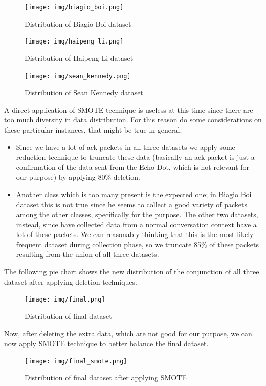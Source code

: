 \documentclass[sigconf]{acmart}
\begin{document}
\begin{figure}[h!]
        \texttt{[image: img/biagio\_boi.png]}
        \caption{Distribution of Biagio Boi dataset}
        \label{fig:parser}
    \end{figure}
    
\begin{figure}[h!]
        \texttt{[image: img/haipeng\_li.png]}
        \caption{Distribution of Haipeng Li dataset}
        \label{fig:parser}
    \end{figure}
    
\begin{figure}[h!]
        \texttt{[image: img/sean\_kennedy.png]}
        \caption{Distribution of Sean Kennedy dataset}
        \label{fig:parser}
    \end{figure}
A direct application of SMOTE technique is useless at this time since there are too much diversity in data distribution. For this reason do some considerations on these particular instances, that might be true in general:
\begin{itemize}
\item Since we have a lot of ack packets in all three datasets we apply some reduction technique to truncate these data (basically an ack packet is just a confirmation of the data sent from the Echo Dot, which is not relevant for our purpose) by applying 80\% deletion.
\item Another class which is too many present is the expected one; in Biagio Boi dataset this is not true since he seems to collect a good variety of packets among the other classes, specifically for the purpose. The other two datasets, instead, since have collected data from a normal conversation context have a lot of these packets. We can reasonably thinking that this is the most likely frequent dataset during collection phase, so we truncate 85\% of these packets resulting from the union of all three datasets.
\end{itemize}
The following pie chart shows the new distribution of the conjunction of all three dataset after applying deletion techniques.

\begin{figure}[h!]
        \texttt{[image: img/final.png]}
        \caption{Distribution of final dataset}
        \label{fig:parser}
    \end{figure}
    
Now, after deleting the extra data, which are not good for our purpose, we can now apply SMOTE technique to better balance the final dataset.
\begin{figure}[h!]
        \texttt{[image: img/final\_smote.png]}
        \caption{Distribution of final dataset after applying SMOTE}
        \label{fig:parser}
    \end{figure}
\end{document}
